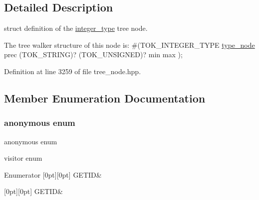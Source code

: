 \subsection{Detailed Description}
struct definition of the \hyperlink{structinteger__type}{integer\+\_\+type} tree node. 

The tree walker structure of this node is\+: \#(T\+O\+K\+\_\+\+I\+N\+T\+E\+G\+E\+R\+\_\+\+T\+Y\+PE \hyperlink{structtype__node}{type\+\_\+node} prec (T\+O\+K\+\_\+\+S\+T\+R\+I\+NG)? (T\+O\+K\+\_\+\+U\+N\+S\+I\+G\+N\+ED)? min max ); 

Definition at line 3259 of file tree\+\_\+node.\+hpp.



\subsection{Member Enumeration Documentation}
\mbox{\label{structinteger__type_a9a3981dbefd2a0254c0423da687b2884}} 
\subsubsection{\texorpdfstring{anonymous enum}{anonymous enum}}
{\footnotesize\ttfamily anonymous enum}



visitor enum 

\begin{DoxyEnumFields}{Enumerator}
[0pt][0pt]{}\mbox{\label{structinteger__type_a9a3981dbefd2a0254c0423da687b2884a349f2bda283f262aec8d3164f17fa7a2}} 
G\+E\+T\+ID&\\
\hline

[0pt][0pt]{}\mbox{\label{structinteger__type_a9a3981dbefd2a0254c0423da687b2884a349f2bda283f262aec8d3164f17fa7a2}} 
G\+E\+T\+ID&\\
\hline

\end{DoxyEnumFields}


